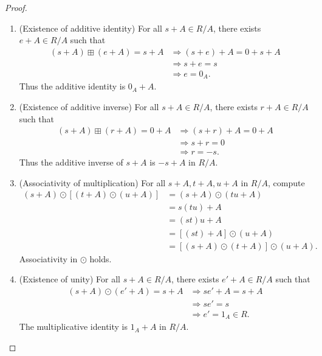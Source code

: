 \begin{proof}
\begin{enumerate}
        We have shown $R/A$ closed under addition $\boxplus$, we continue to proof 
        \[
            st+A = s't' + A.
        \]
        Which is equivalent to show $R/A$ closed under the multiplication $\odot$. Applying 
        the results that we found from \eqref{eq:r2.31}, \eqref{eq:r2.32} we have 
        \[
            st -s't' = a_1 a_2 + a_1t' + s'a_2
        \]
        Is $a_1t'$ in $A$? Of course, since $a_1 \in A, t' \in R \Longrightarrow a_1t' \in A \triangleleft R$.
        So as $s'a_2 \in A \triangleleft R$.

        \item (Existence of additive identity) For all $s+A \in R/A$, there exists $e+A \in R/A$ such that 
        \begin{align*}
            (s + A) \boxplus (e+A) = s + A &\Rightarrow (s+e) + A = 0 + s + A\\
            &\Rightarrow s+e = s\\
            &\Rightarrow e = 0_A.
        \end{align*}
        Thus the additive identity is $0_A + A$.

        \item (Existence of additive inverse) For all $s+A \in R/A$, there exists $r+A \in R/A$ such that 
        \begin{align*}
            (s + A) \boxplus (r+A) = 0 + A &\Rightarrow (s+r) + A = 0 + A\\
            &\Rightarrow s+r = 0\\
            &\Rightarrow r =-s.
        \end{align*}
        Thus the additive inverse of $s+A$ is $-s+A$ in $R/A$.

        \item (Associativity of multiplication) For all $s+A, t+A, u+A$ in $R/A$, compute 
        \begin{align*}
            (s+A) \odot [(t+A) \odot (u+A)] &= (s+A) \odot (tu + A)\\
            &= s(tu) +A\\
            &= (st)u + A\\
            &= [(st)+A] \odot (u+A)\\
            &= [(s+A) \odot (t+A)] \odot (u+A).
        \end{align*}
        Associativity in $\odot$ holds.

        \item (Existence of unity) For all $s+A \in R/A$, there exists $e'+A \in R/A$ such that 
    \begin{align*}
        (s + A) \odot (e'+A) = s + A &\Rightarrow se'+A = s + A\\
        &\Rightarrow se' = s\\
        &\Rightarrow e' = 1_A \in R.
    \end{align*}
    The multiplicative identity is $1_A + A$ in $R/A$.


\end{enumerate}
\end{proof}
